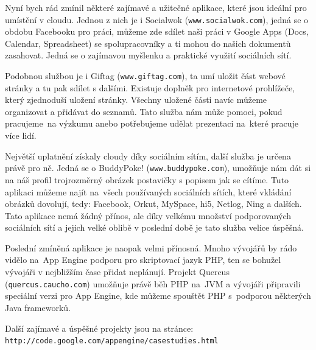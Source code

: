 Nyní bych rád zmínil některé zajímavé a užitečné aplikace, které jsou ideální pro umístění v cloudu. Jednou z nich je i Socialwok (\verb|www.socialwok.com|), jedná se o obdobu Facebooku pro práci, můžeme zde sdílet naši práci v Google Apps (Docs, Calendar, Spreadsheet) se spolupracovníky a ti mohou do našich dokumentů zasahovat. Jedná se o zajímavou myšlenku a praktické využití sociálních sítí.

Podobnou službou je i Giftag (\verb|www.giftag.com|), ta umí uložit část webové stránky a tu pak sdílet s dalšími. Existuje doplněk pro internetové prohlížeče, který zjednoduší uložení stránky. Všechny uložené části navíc můžeme organizovat a přidávat do seznamů. Tato služba nám může pomoci, pokud pracujeme~na výzkumu anebo potřebujeme udělat prezentaci na~které pracuje více lidí.
 
Největší uplatnění získaly cloudy díky sociálním sítím, další služba je určena právě pro ně. Jedná se o BuddyPoke! (\verb|www.buddypoke.com|), umožňuje nám dát si na náš profil trojrozměrný obrázek postavičky s popisem jak se cítíme. Tuto aplikaci můžeme najít na~všech používaných sociálních sítích, které vkládání obrázků dovolují, tedy: Facebook, Orkut, MySpace, hi5, Netlog, Ning a dalších. Tato aplikace nemá žádný přínos, ale díky velkému množství podporovaných sociálních sítí a jejich velké oblibě v poslední době je tato služba velice úspěšná.

Poslední zmíněná aplikace je naopak velmi přínosná. Mnoho vývojářů by rádo vidělo na~App Engine podporu pro skriptovací jazyk PHP, ten se bohužel vývojáři v nejbližším čase přidat neplánují. Projekt Quercus (\verb|quercus.caucho.com|) umožňuje právě běh PHP na~JVM a vývojáři připravili speciální verzi pro App Engine, kde můžeme spouštět PHP s~podporou některých Java frameworků.

Další zajímavé a úspěšné projekty jsou na stránce: \\ \verb|http://code.google.com/appengine/casestudies.html|

